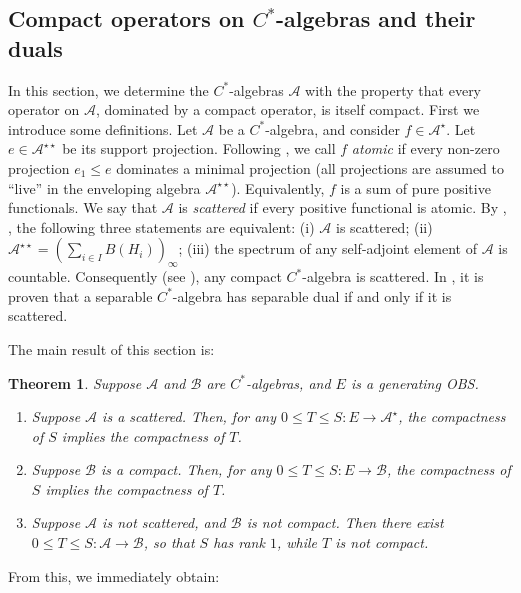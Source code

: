 \documentclass[12pt]{amsart}
\theoremstyle{plain}
\newtheorem{theorem}{Theorem}[subsection]
\theoremstyle{definition}
\renewcommand{\leq}{\leqslant}
\newcommand{\A}{\mathcal{A}}
\begin{document}
\subsection{Compact operators on $C^*$-algebras and their duals}\label{ss:C*alg}
In this section, we determine the $C^*$-algebras $\A$ with the property that
every operator on $\A$, dominated by a compact operator, is itself compact.
First we introduce some definitions. Let $\A$ be a $C^*$-algebra, and
consider $f \in \A^\star$. Let $e \in \A^{\star\star}$ be its support
projection. Following \cite{Je}, we call $f$ \emph{atomic} if every non-zero
projection $e_1 \leq e$ dominates a minimal projection (all projections are
assumed to ``live'' in the enveloping algebra $\A^{\star\star}$).
Equivalently, $f$ is a sum of pure positive functionals. We say that $\A$
is \emph{scattered} if every positive functional is atomic. By \cite{Hu}, \cite{Je},
the following three statements are equivalent: (i) $\A$ is scattered;
(ii) $\A^{\star\star} = (\sum_{i \in I} B(H_i))_\infty$; (iii) the
spectrum of any self-adjoint element of $\A$ is countable. Consequently
(see \cite[Exercise 4.7.20]{Dix}), any compact $C^*$-algebra is scattered. 
In \cite{Woj}, it is proven that a separable $C^*$-algebra
has separable dual if and only if it is scattered.

The main result of this section is:

\begin{theorem}\label{thm:scatter}
Suppose $\A$ and ${\mathcal{B}}$ are $C^*$-algebras,
and $E$ is a generating OBS.
\begin{enumerate}
\item
Suppose $\A$ is a scattered.
Then, for any $0 \leq T \leq S : E \to \A^\star$, the compactness of
$S$ implies the compactness of $T$.
\item
Suppose ${\mathcal{B}}$ is a compact.
Then, for any $0 \leq T \leq S : E \to {\mathcal{B}}$, the compactness of
$S$ implies the compactness of $T$.
\item
Suppose $\A$ is not scattered, and ${\mathcal{B}}$ is not compact.
Then there exist $0 \leq T \leq S : \A \to {\mathcal{B}}$,
so that $S$ has rank $1$, while $T$ is not compact.
\end{enumerate}
\end{theorem}

From this, we immediately obtain:
\end{document}
